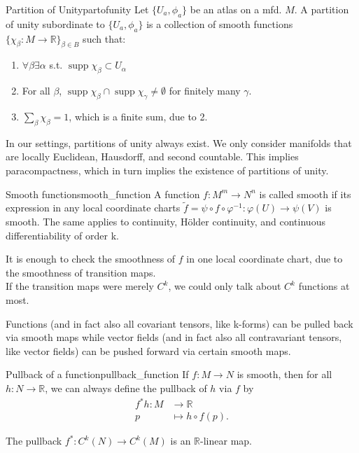 \begin{colordef}{Partition of Unity}{partofunity}
Let $\{U_a, \phi_a\}$ be an atlas on a mfd. $M$. A partition of unity subordinate to $\{U_a, \phi_a\}$ is a collection of smooth functions $\{\chi_\beta:M\to \mathbb{R}\}_{\beta \in B}$ such that:
\begin{enumerate}[itemsep=0pt, topsep=0pt]
    \item $\forall\beta\exists \alpha$ s.t. $\operatorname{supp}\chi_\beta\subset U_\alpha$
    \item For all $\beta$, $\operatorname{supp} \chi_\beta \cap \operatorname{supp} \chi_\gamma \neq \emptyset$ for finitely many $\gamma$.
    \item $\sum_{\beta} \chi_\beta = 1$, which is a finite sum, due to 2.
\end{enumerate}
\end{colordef}

\begin{colremark}
In our settings, partitions of unity always exist. We only consider manifolds that are locally Euclidean, Hausdorff, and second countable. This implies paracompactness, which in turn implies the existence of partitions of unity.
\end{colremark}

\begin{colordef}{Smooth function}{smooth_function}
A function $f: M^m \to N^n$ is called smooth if its expression in any local coordinate charts $\tilde{f} = \psi \circ f \circ \varphi^{-1}: \varphi(U) \to \psi(V)$ is smooth. The same applies to continuity, Hölder continuity, and continuous differentiability of order k.
\end{colordef}

\begin{colremark}
It is enough to check the smoothness of $f$ in one local coordinate chart, due to the smoothness of transition maps.\\
If the transition maps were merely $C^k$, we could only talk about $C^k$ functions at most.
\end{colremark}


Functions (and in fact also all covariant tensors, like k-forms) can be pulled back via smooth maps while vector fields (and in fact also all contravariant tensors, like vector fields) can be pushed forward via certain smooth maps. 

\begin{colordef}{Pullback of a function}{pullback_function}
If $f: M \to N$ is smooth, then for all $h : N \to \mathbb{R}$, we can always define the pullback of $h$ via $f$ by 
\begin{align*}
    f^*h: M &\to \mathbb{R}\\
    p &\mapsto h \circ f(p).
\end{align*}
\end{colordef}
The pullback $f^* : C^k(N) \to C^k(M)$ is an $\mathbb{R}$-linear map.

